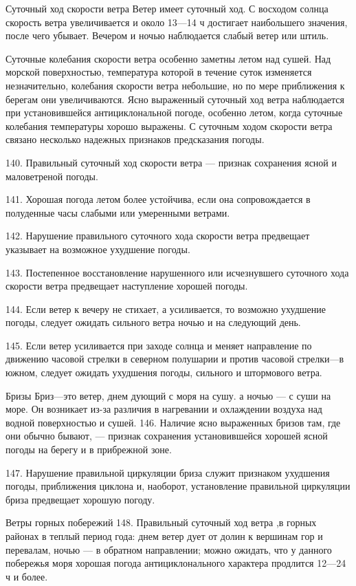 Суточный ход скорости ветра
Ветер имеет суточный ход. С восходом солнца скорость ветра увеличивается и около 13—14 ч достигает наибольшего значения, после чего убывает. Вечером и ночью наблюдается слабый ветер или штиль.

Суточные колебания скорости ветра особенно заметны летом над сушей. Над морской поверхностью, температура которой в течение суток изменяется незначительно, колебания скорости ветра небольшие, но по мере приближения к берегам они увеличиваются. Ясно выраженный суточный ход ветра наблюдается при установившейся антициклональной погоде, особенно летом, когда суточные колебания температуры хорошо выражены. С суточным ходом скорости ветра связано несколько надежных признаков предсказания погоды.

140. Правильный суточный ход скорости ветра — признак сохранения ясной и маловетреной погоды.

141. Хорошая погода летом более устойчива, если она сопровождается в полуденные часы слабыми или умеренными ветрами.

142. Нарушение правильного суточного хода скорости ветра предвещает указывает на возможное ухудшение погоды.

143. Постепенное восстановление нарушенного или исчезнувшего суточного хода скорости ветра предвещает наступление хорошей погоды.

144. Если ветер к вечеру не стихает, а усиливается, то возможно ухудшение погоды, следует ожидать сильного ветра ночью и на следующий день.

145. Если ветер усиливается при заходе солнца и меняет направление по движению часовой стрелки в северном полушарии и против часовой стрелки—в южном, следует ожидать ухудшения погоды, сильного и штормового ветра.

Бризы
Бриз—это ветер, днем дующий с моря на сушу. а ночью — с суши на море. Он возникает из-за различия в нагревании и охлаждении воздуха над водной поверхностью и сушей.
146. Наличие ясно выраженных бризов там, где они обычно бывают, — признак сохранения установившейся хорошей ясной погоды на берегу и в прибрежной зоне.

147. Нарушение правильной циркуляции бриза служит признаком ухудшения погоды, приближения циклона и, наоборот, установление правильной циркуляции бриза предвещает хорошую погоду.

Ветры горных побережий
148. Правильный суточный ход ветра ,в горных районах в теплый период года: днем ветер дует от долин к вершинам гор и перевалам, ночью — в обратном направлении; можно ожидать, что у данного побережья моря хорошая погода антициклонального характера продлится 12—24 ч и более.

